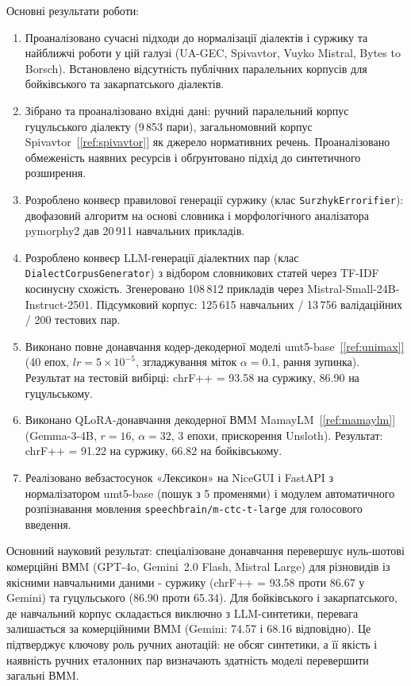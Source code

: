 \documentclass[14pt]{extarticle}
\newcommand{\citeref}[1]{\hyperref[#1]{[\ref*{#1}]}}
\begin{document}
Основні результати роботи:
\begin{enumerate}
  \item Проаналізовано сучасні підходи до нормалізації діалектів і суржику та найближчі роботи у цій галузі (UA-GEC, Spivavtor, Vuyko Mistral, Bytes to Borsch). Встановлено відсутність публічних паралельних корпусів для бойківського та закарпатського діалектів.
  \item Зібрано та проаналізовано вхідні дані: ручний паралельний корпус гуцульського діалекту (9\,853 пари), загальномовний корпус Spivavtor~\citeref{ref:spivavtor} як джерело нормативних речень. Проаналізовано обмеженість наявних ресурсів і обґрунтовано підхід до синтетичного розширення.
  \item Розроблено конвеєр правилової генерації суржику (клас \texttt{SurzhykErrorifier}): двофазовий алгоритм на основі словника і морфологічного аналізатора pymorphy2 дав 20\,911 навчальних прикладів.
  \item Розроблено конвеєр LLM-генерації діалектних пар (клас \texttt{DialectCorpusGenerator}) з відбором словникових статей через TF-IDF косинусну схожість. Згенеровано 108\,812 прикладів через Mistral-Small-24B-Instruct-2501. Підсумковий корпус: 125\,615 навчальних / 13\,756 валідаційних / 200 тестових пар.
  \item Виконано повне донавчання кодер-декодерної моделі umt5-base~\citeref{ref:unimax} (40 епох, $lr = 5 \times 10^{-5}$, згладжування міток $\alpha = 0.1$, рання зупинка). Результат на тестовій вибірці: chrF++ = 93.58 на суржику, 86.90 на гуцульському.
  \item Виконано QLoRA-донавчання декодерної ВМM MamayLM~\citeref{ref:mamaylm} (Gemma-3-4B, $r = 16$, $\alpha = 32$, 3 епохи, прискорення Unsloth). Результат: chrF++ = 91.22 на суржику, 66.82 на бойківському.
  \item Реалізовано вебзастосунок «Лексикон» на NiceGUI і FastAPI з нормалізатором umt5-base (пошук з 5 променями) і модулем автоматичного розпізнавання мовлення \texttt{speechbrain/m-ctc-t-large} для голосового введення.
\end{enumerate}

Основний науковий результат: спеціалізоване донавчання перевершує нуль-шотові комерційні ВМM (GPT-4o, Gemini~2.0 Flash, Mistral Large) для різновидів із якісними навчальними даними - суржику (chrF++ = 93.58 проти 86.67 у Gemini) та гуцульського (86.90 проти 65.34). Для бойківського і закарпатського, де навчальний корпус складається виключно з LLM-синтетики, перевага залишається за комерційними ВМM (Gemini: 74.57 і 68.16 відповідно). Це підтверджує ключову роль ручних анотацій: не обсяг синтетики, а її якість і наявність ручних еталонних пар визначають здатність моделі перевершити загальні ВМM.
\end{document}
